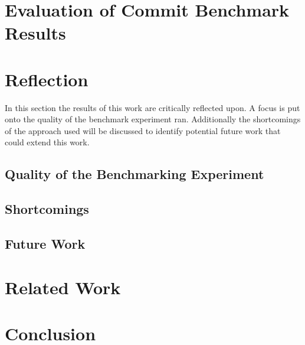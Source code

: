 \documentclass[	runningheads,
				a4paper]{llncs}
\begin{document}
\section{Evaluation of Commit Benchmark Results}
\label{sec:exp_evaluation}



\section{Reflection}
In this section the results of this work are critically reflected upon. A focus is put onto the quality of the benchmark experiment ran. Additionally the shortcomings of the approach used will be discussed to identify potential future work that could extend this work.

\subsection{Quality of the Benchmarking Experiment}



\subsection{Shortcomings}

\subsection{Future Work}

\section{Related Work}

\section{Conclusion}
	
	
	
	
	
\end{document}
